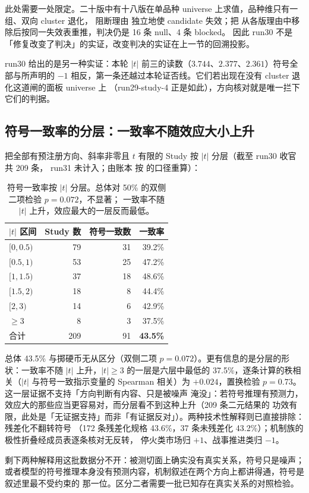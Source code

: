 此处需要一处限定。二十版中有十八版在单品种 universe 上求值，品种维只有一组、双向 cluster 退化，
阻断理由  独立地使 candidate 失效；把
 从各版理由中移除后按同一失效表重推，判决仍是 16 条 null、4 条 blocked。
因此 run30 不是「修复改变了判决」的实证，改变判决的实证在上一节的回溯投影。

run30 给出的是另一种实证：本轮 $|t|$ 前三的读数（$3.744$、$2.377$、$2.361$）符号全部与所声明的
$-1$ 相反，第一条还越过本轮证否线。它们若出现在没有 cluster 退化这道闸的面板 universe 上
（run29-study-4 正是如此），方向核对就是唯一拦下它们的判据。

\subsection{符号一致率的分层：一致率不随效应大小上升}

把全部有预注册方向、斜率非零且 $t$ 有限的 Study 按 $|t|$ 分层（截至 run30 收官共 209 条，
run31 未计入；由账本  按 
的口径重算）：

\begin{table}[htbp]\centering\footnotesize
\begin{tabular}{@{}>{\raggedright\arraybackslash}p{} r r r@{}}
\toprule
$|t|$ 区间 & Study 数 & 符号一致数 & 一致率 \\ \midrule
$[0,0.5)$ & 79 & 31 & 39.2\% \\
$[0.5,1)$ & 53 & 25 & 47.2\% \\
$[1,1.5)$ & 37 & 18 & 48.6\% \\
$[1.5,2)$ & 18 & 8 & 44.4\% \\
$[2,3)$ & 14 & 6 & 42.9\% \\
$\geq 3$ & 8 & 3 & 37.5\% \\ \midrule
合计 & 209 & 91 & \textbf{43.5\%} \\
\bottomrule\end{tabular}
\caption{符号一致率按 $|t|$ 分层。总体对 50\% 的双侧二项检验 $p=0.072$，不显著；
一致率不随 $|t|$ 上升，效应最大的一层反而最低。}
\end{table}

总体 43.5\% 与掷硬币无从区分（双侧二项 $p=0.072$）。更有信息的是分层的形状：一致率不随 $|t|$
上升，$|t|\geq 3$ 的一层是六层中最低的 37.5\%，逐条计算的秩相关（$|t|$ 与符号一致指示变量的
Spearman 相关）为 $+0.024$，置换检验 $p=0.73$。这一层证据不支持「方向判断有内容、只是被噪声
淹没」：若符号推理有预测力，效应大的那些应当更容易对，而分层看不到这种上升（209 条二元结果的
功效有限，此处是「无证据支持」而非「有证据反对」）。两种技术性解释则已直接排除：残差化不翻转符号
（172 条残差化规格 43.6\%，37 条未残差化 43.2\%）；机制族的极性折叠经成员表逐条核对无反转，
停火类市场归 $+1$、战事推进类归 $-1$。

剩下两种解释用这批数据分不开：被测切面上确实没有真实关系，符号只是噪声；
或者模型的符号推理本身没有预测内容，机制叙述在两个方向上都讲得通，符号是叙述里最不受约束的
那一位。区分二者需要一批已知存在真实关系的对照检验。
